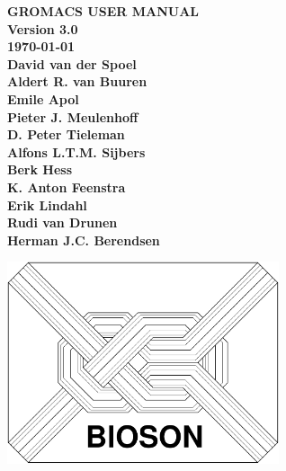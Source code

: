 \documentclass[11pt]{book}
\newcommand{\gmxver}{3.0}
\begin{document}
\newpage
\thispagestyle{empty}

%
%
\cleardoublepage
\footrulewidth 0.4pt
\pagestyle{fancyplain}
\renewcommand{\chaptermark}[1]{\markboth{#1}{#1}} %
\renewcommand{\sectionmark}[1]{\markright{\thesection\ #1}}
\lhead[\fancyplain{}{\bf\sf\thepage}]{\fancyplain{}{\bf\sf\rightmark}}
\rhead[\fancyplain{}{\bf\sf\leftmark}]{\fancyplain{}{\bf\sf\thepage}}
\cfoot{}

\setcounter{page}{1}

\begin{center}
{\LARGE\bf GROMACS USER MANUAL}                         \\[1cm]
{\LARGE\bf Version \gmxver}                             \\[1cm]
{\LARGE\bf \today}                                      \\[1cm]
{\large\bf 
David van der Spoel     \\
Aldert R. van Buuren    \\
Emile Apol              \\
Pieter J. Meulenhoff    \\
D. Peter Tieleman       \\
Alfons L.T.M. Sijbers   \\
Berk Hess               \\
K. Anton Feenstra       \\
Erik Lindahl            \\
Rudi van Drunen         \\
Herman J.C. Berendsen}
\end{center}

\vspace{0.5cm}

\centerline{\includegraphics[width=8cm]{plots/bioson}}

\vspace{1cm}
\end{document}
